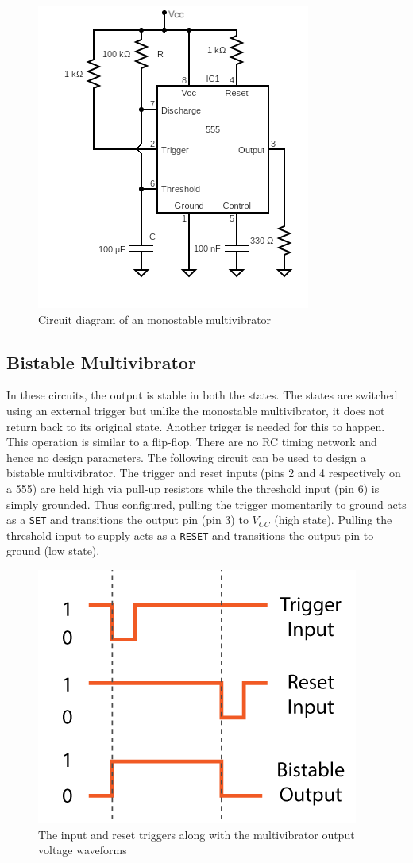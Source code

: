 \begin{figure}[H]
    \centering
    \includegraphics[width=0.65\columnwidth]{images/mono2.png}
    \caption{Circuit diagram of an monostable multivibrator}
    \label{mono2}
\end{figure}

\subsection{Bistable Multivibrator}
In these circuits, the output is stable in both the states. The states are switched using an
external trigger but unlike the monostable multivibrator, it does not return back to its
original state. Another trigger is needed for this to happen. This operation is similar to a
flip-flop. There are no RC timing network and hence no design parameters. The
following circuit can be used to design a bistable multivibrator. The trigger and reset
inputs (pins 2 and 4 respectively on a 555) are held high via pull-up resistors while the
threshold input (pin 6) is simply grounded. Thus configured, pulling the trigger
momentarily to ground acts as a \verb|SET| and transitions the output pin (pin 3) to $V_{CC}$ (high
state). Pulling the threshold input to supply acts as a \verb|RESET| and transitions the output pin
to ground (low state). 

\begin{figure}[H]
    \centering
    \includegraphics[width=0.5\columnwidth]{images/bis1.png}
    \caption{The input and reset triggers along with the multivibrator output voltage waveforms}
    \label{bis1}
\end{figure}

